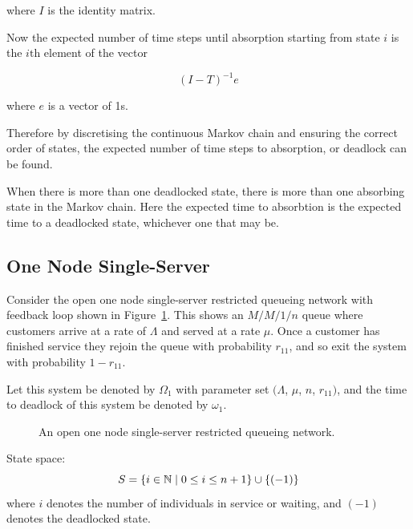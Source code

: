 \documentclass{article}
\begin{document}
where $I$ is the identity matrix.

Now the expected number of time steps until absorption starting from state $i$ is the $i\text{th}$ element of the vector

\begin{equation}
  (I - T)^{-1}e
\end{equation}

where $e$ is a vector of 1s.

Therefore by discretising the continuous Markov chain and ensuring the correct order of states, the expected number of time steps to absorption, or deadlock can be found.

When there is more than one deadlocked state, there is more than one absorbing state in the Markov chain.
Here the expected time to absorbtion is the expected time to a deadlocked state, whichever one that may be.










\subsection{One Node Single-Server}\label{sec:1nodenet}

Consider the open one node single-server restricted queueing network with feedback loop shown in Figure~\ref{fig:queueingnetwork_1node}.
This shows an \(M/M/1/n\) queue where customers arrive at a rate of $\Lambda$ and served at a rate $\mu$.
Once a customer has finished service they rejoin the queue with probability $r_{11}$, and so exit the system with probability $1 - r_{11}$.

Let this system be denoted by $\Omega_1$ with parameter set $(\Lambda$, $\mu$, $n$, $r_{11})$, and the time to deadlock of this system be denoted by $\omega_1$.

\begin{figure}[!htbp]
  \begin{center}
  
  \end{center}
  \caption{An open one node single-server restricted queueing network.}
  \label{fig:queueingnetwork_1node}
\end{figure}

State space:
        \[S = \{i\in\mathbb{N} \nonscript\; | \nonscript\; 0 \leq i \leq n + 1
        \}\cup\{(-1)\}\]
where \(i\) denotes the number of individuals in service or waiting, and $(-1)$ denotes the deadlocked state.
\end{document}
